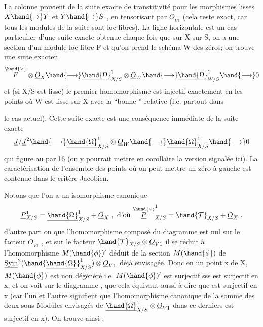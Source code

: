 
La colonne provient de la suite exacte de transtitivité pour les
morphismes lisses $X\hand{\to} Y$ et $Y\hand{\to} S$ , en  tensorisant par $\underline{O}_{V1}$ (cela reste
exact, car tous les modules de la suite sont loc libres). La ligne
horizontale est un cas particulier d'une suite exacte obtenue chaque
fois que sur X  sur S, on a une section \hand{$\mu$} d'un module loc libre F
et qu'on prend le schéma W des zéros; on trouve une suite exacten
\[ \overset{\hand{\vee}}{F}\otimes \underline{O}_X \hand{\longrightarrow} \underline{\hand{\Omega}}^1_{X/S}\otimes \underline{O}_W \hand{\longrightarrow} \underline{\hand{\Omega}}^1_{W/S} \hand{\longrightarrow} 0 \]
et (si X/S est lisse) le premier homomorphisme est injectif exactement en les points où
W est lisse sur X avec la ``bonne ''  relative (i.e. partout dans

le cas actuel).  Cette suite exacte est 
  une
conséquence immédiate de la suite exacte
\[ \underline{J}/\underline{J}^2\hand{\longrightarrow} \underline{\hand{\Omega}}^1_{X/S}\otimes \underline{O}_W \hand{\longrightarrow} \underline{\hand{\Omega}}^1_{X/S} \hand{\longrightarrow} 0 \]
\placedmargin{16 \textbar} qui figure au par.16 (on y pourrait mettre en corollaire la version
signalée ici). La caractérisation de l'ensemble des points où on
peut mettre un zéro à gauche est contenue dans le critère Jacobien.

Notons que l'on a un isomorphisme canonique
\[ \underline{P}^1_{X/S} = \underline{\hand{\Omega}}^1_{X/S} + \underline{O}_X \ ,\ \text{d'où}\ \overset{\hand{\scriptscriptstyle\vee}}{\underline{P}}^1_{X/S} = \hand{\mathcal{T}}_{X/S} + \underline{O}_X \ , \]
d'autre part on  que l'homomorphisme composé \hand{$\mu$} du diagramme  est nul
sur le facteur $\underline{O}_{V1}$ , et sur le facteur $\hand{\mathcal{T}}_{X/S}\otimes\underline{O}_{V1}$ il se réduit à
l'homomorphisme $M(\hand{\phi})'$ déduit de la section $M(\hand{\phi})$ de $\underline{\mathrm{Sym}}^2(\hand{\underline{\hand{\Omega}}}^1_{X/S})\otimes \underline{O}_{V1}$ déjà
envisagée. Donc en un point x de X, $M(\hand{\phi})$ est non dégénéré i.e. $M(\hand{\phi})'$
est surjectif sss \hand{$\mu$} est surjectif en x, et on voit sur le diagramme ,
que cela équivaut aussi à dire que \hand{$\nu$} est surjectif en x (car l'un et l'autre
signifient que l'homomorphisme canonique de la somme des deux sous
Modules envisagés de $\underline{\hand{\Omega}}^1_{X/S}\otimes \underline{O}_{V1}$ dans ce derniers est surjectif en
x). On trouve ainsi :

